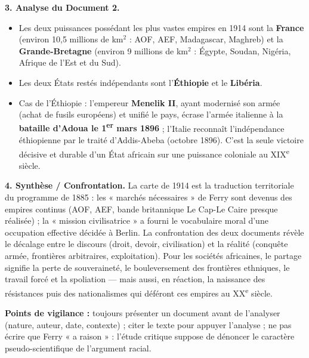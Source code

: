 \documentclass[11pt]{article}
\begin{document}
\begin{corrige}
\textbf{3. Analyse du Document 2.}
\begin{itemize}
    \item Les deux puissances possédant les plus vastes empires en 1914 sont la \textbf{France} (environ 10,5 millions de km$^2$ : AOF, AEF, Madagascar, Maghreb) et la \textbf{Grande-Bretagne} (environ 9 millions de km$^2$ : Égypte, Soudan, Nigéria, Afrique de l'Est et du Sud).
    \item Les deux États restés indépendants sont l'\textbf{Éthiopie} et le \textbf{Libéria}.
    \item Cas de l'Éthiopie : l'empereur \textbf{Menelik II}, ayant modernisé son armée (achat de fusils européens) et unifié le pays, écrase l'armée italienne à la \textbf{bataille d'Adoua le 1\textsuperscript{er} mars 1896} ; l'Italie reconnaît l'indépendance éthiopienne par le traité d'Addis-Abeba (octobre 1896). C'est la seule victoire décisive et durable d'un État africain sur une puissance coloniale au XIX\textsuperscript{e} siècle.
\end{itemize}

\textbf{4. Synthèse / Confrontation.}
La carte de 1914 est la traduction territoriale du programme de 1885 : les « marchés nécessaires » de Ferry sont devenus des empires continus (AOF, AEF, bande britannique Le Cap-Le Caire presque réalisée) ; la « mission civilisatrice » a fourni le vocabulaire moral d'une occupation effective décidée à Berlin. La confrontation des deux documents révèle le décalage entre le discours (droit, devoir, civilisation) et la réalité (conquête armée, frontières arbitraires, exploitation). Pour les sociétés africaines, le partage signifie la perte de souveraineté, le bouleversement des frontières ethniques, le travail forcé et la spoliation — mais aussi, en réaction, la naissance des résistances puis des nationalismes qui déféront ces empires au XX\textsuperscript{e} siècle.

\textbf{Points de vigilance :} toujours présenter un document avant de l'analyser (nature, auteur, date, contexte) ; citer le texte pour appuyer l'analyse ; ne pas écrire que Ferry « a raison » : l'étude critique suppose de dénoncer le caractère pseudo-scientifique de l'argument racial.
\end{corrige}
\end{document}
